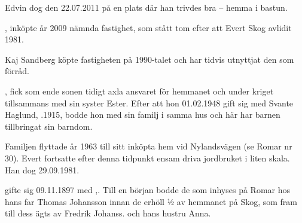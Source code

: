 Edvin dog den 22.07.2011 på en plats där han trivdes bra – hemma i bastun.



, inköpte år 2009 nämnda fastighet, som stått tom efter att Evert Skog avlidit 1981.\jhvspace{}


Kaj Sandberg köpte fastigheten på 1990-talet och har tidvis utnyttjat den som förråd.\jhvspace{}



, fick som ende sonen tidigt axla ansvaret för hemmanet och under kriget tillsammans med sin syster Ester. Efter att hon 01.02.1948 gift sig med Svante Haglund, .1915, bodde hon med sin familj i samma hus och här har barnen tillbringat sin barndom.
\begin{jhchildren}
  \item {}
  \item {}
  \item {}
  \item {}
  \item {}
\end{jhchildren}

Familjen flyttade år 1963 till sitt inköpta hem vid Nylandsvägen (se Romar nr 30). Evert fortsatte efter denna tidpunkt ensam driva jordbruket i liten skala. Han dog 29.09.1981.


 gifte sig 09.11.1897 med ,. Till en början bodde de som inhyses på Romar hos hans far Thomas Johansson innan de erhöll ½ av hemmanet på Skog, som fram till dess ägts av Fredrik Johanss. och hans hustru Anna.

